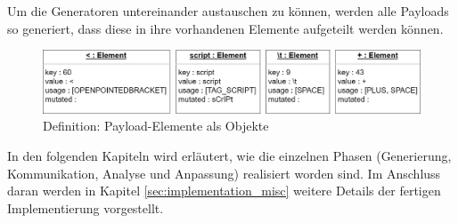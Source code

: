 
Um die Generatoren untereinander austauschen zu können, werden alle Payloads so generiert, dass diese in ihre vorhandenen Elemente aufgeteilt werden können.

\begin{figure}[htbp] 
	\centering
	\includegraphics[width=\textwidth]{contents/images/SmartGrazerElementDefinition}
	\caption{Definition: Payload-Elemente als Objekte}
	\label{fig:element-definition}
\end{figure}

In den folgenden Kapiteln wird erläutert, wie die einzelnen Phasen (Generierung, Kommunikation, Analyse und Anpassung) realisiert worden sind. Im Anschluss daran werden in Kapitel \ref{sec:implementation_misc} weitere Details der fertigen Implementierung vorgestellt.